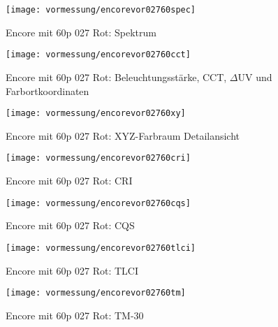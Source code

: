 \documentclass[pagesize,paper=A4,fontsize=12pt,utf8,numbers=noenddot,bibliography=totoc,listof=totoc,DIV=11,BCOR=1mm]{scrreprt}
\begin{document}
\begin{figure}[htp]     %
\centering
\texttt{[image: vormessung/encorevor02760spec]} 
\caption {Encore mit 60p 027 Rot: Spektrum} 
\end{figure}

\begin{figure}[htp]     %
\centering
\texttt{[image: vormessung/encorevor02760cct]} 
\caption {Encore mit 60p 027 Rot: Beleuchtungsstärke, CCT, $\Delta$UV und Farbortkoordinaten} 
\end{figure}

\begin{figure}[htp]     %
\centering
\texttt{[image: vormessung/encorevor02760xy]} 
\caption {Encore mit 60p 027 Rot: XYZ-Farbraum Detailansicht} 
\end{figure}

\begin{figure}[htp]     %
\centering
\texttt{[image: vormessung/encorevor02760cri]} 
\caption {Encore mit 60p 027 Rot: CRI} 
\end{figure}

\begin{figure}[htp]     %
\centering
\texttt{[image: vormessung/encorevor02760cqs]} 
\caption {Encore mit 60p 027 Rot: CQS} 
\end{figure}

\begin{figure}[htp]     %
\centering
\texttt{[image: vormessung/encorevor02760tlci]} 
\caption {Encore mit 60p 027 Rot: TLCI} 
\end{figure}

\begin{figure}[htp]     %
\centering
\texttt{[image: vormessung/encorevor02760tm]} 
\caption {Encore mit 60p 027 Rot: TM-30} 
\end{figure}
\end{document}

